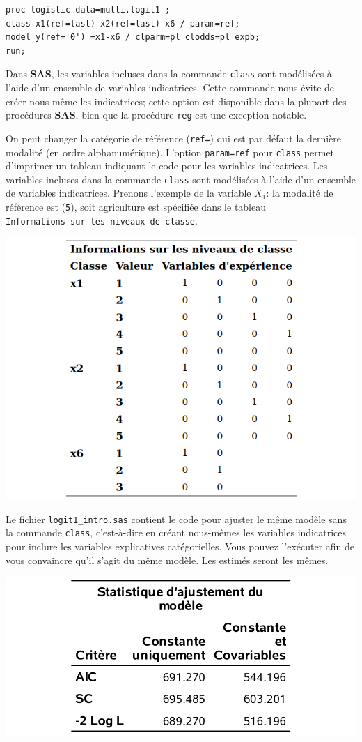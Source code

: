 \documentclass[
  11pt,
  letterpaper,
]{book}
\theoremstyle{definition}
\theoremstyle{definition}
\theoremstyle{definition}
\theoremstyle{remark}
\begin{document}
\begin{verbatim}
proc logistic data=multi.logit1 ;
class x1(ref=last) x2(ref=last) x6 / param=ref;
model y(ref='0') =x1-x6 / clparm=pl clodds=pl expb;
run;
\end{verbatim}

Dans \textbf{SAS}, les variables incluses dans la commande \texttt{class} sont modélisées à l'aide d'un ensemble de variables indicatrices. Cette commande nous évite de créer nous-même les indicatrices; cette option est disponible dans la plupart des procédures \textbf{SAS}, bien que la procédure \texttt{reg} est une exception notable.

On peut changer la catégorie de référence (\texttt{ref=}) qui est par défaut la dernière modalité (en ordre alphanumérique). L'option \texttt{param=ref} pour \texttt{class} permet d'imprimer un tableau indiquant le code pour les variables indicatrices.
Les variables incluses dans la commande \texttt{class} sont modélisées à l'aide d'un ensemble de variables indicatrices. Prenons l'exemple de la variable \(X_1\): la modalité de référence est (\texttt{5}), soit agriculture est spécifiée dans le tableau \texttt{Informations\ sur\ les\ niveaux\ de\ classe}.

\begin{center}\includegraphics[width=0.75\linewidth]{figures/03-logistic-e9} \end{center}

Le fichier \texttt{logit1\_intro.sas} contient le code pour ajuster le même modèle sans la commande \texttt{class}, c'est-à-dire en créant nous-mêmes les variables indicatrices pour inclure les variables explicatives catégorielles. Vous pouvez l'exécuter afin de vous convaincre qu'il s'agit du même modèle. Les estimés seront les mêmes.

\begin{center}\includegraphics[width=0.65\linewidth]{figures/03-logistic-e5} \end{center}
\end{document}
